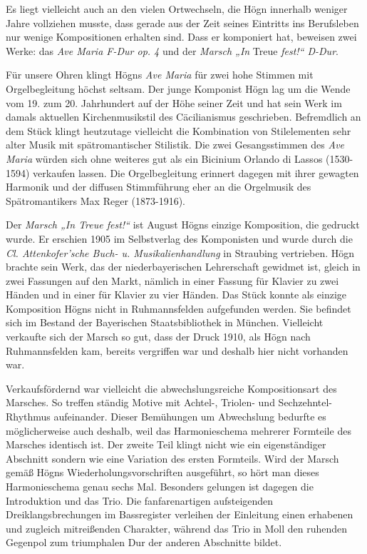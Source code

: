 \documentclass{book}
\begin{document}
Es liegt vielleicht auch an den vielen Ortwechseln, die Högn innerhalb
we\-niger Jahre vollziehen musste, dass gerade aus der Zeit seines
Eintritts ins Berufsleben nur wenige Kompositionen erhalten sind. Dass
er komponiert hat, beweisen zwei Werke: das \textit{Ave Maria F-Dur op.
4} und der \textit{Marsch „In} Treue \textit{fest!“ D-Dur}.

Für unsere Ohren klingt Högns \textit{Ave Maria} für zwei hohe Stimmen
mit Or\-gelbegleitung höchst seltsam. Der junge Komponist Högn lag um
die Wende vom 19. zum 20. Jahrhundert auf der Höhe seiner Zeit und hat
sein Werk im damals aktuellen Kirchenmusikstil des Cäcilianismus
geschrieben. Befremdlich an dem Stück klingt heutzutage vielleicht die
Kombination von Stilelementen sehr alter Musik mit spätromantischer
Stilistik. Die zwei Gesangsstimmen des \textit{Ave Maria} würden sich
ohne weiteres gut als ein Bicinium Orlando di Lassos (1530-1594)
verkaufen lassen. Die Orgelbegleitung erinnert dagegen mit ihrer
gewagten Harmonik und der diffusen Stimmführung eher an die Orgelmusik
des Spätromantikers Max Reger (1873-1916). 

Der \textit{Marsch „In Treue fest!“} ist August Högns einzige
Komposition, die ge\-druckt wurde. Er erschien 1905 im Selbstverlag des
Komponisten und wurde durch die \textit{Cl. Attenkofer’sche Buch- u.
Musikalienhandlung} in Straubing vertrieben. Högn brachte sein Werk,
das der niederbayerischen Lehrerschaft gewidmet ist, gleich in zwei
Fassungen auf den Markt, nämlich in einer Fassung für Klavier zu zwei
Händen und in einer für Klavier zu vier Händen. Das Stück konnte als
einzige Komposition Högns nicht in Ruhmannsfelden aufgefunden wer\-den.
Sie befindet sich im Bestand der Bayerischen Staatsbibliothek in
Mün\-chen. Vielleicht verkaufte sich der Marsch so gut, dass der Druck
1910, als Högn nach Ruhmannsfelden kam, bereits vergriffen war und
deshalb hier nicht vorhanden war.


Verkaufsfördernd war vielleicht die abwechslungsreiche Kompositionsart
des Marsches. So treffen ständig Motive mit Achtel-, Triolen- und
Sechzehntel-Rhythmus aufeinander. Dieser Bemühungen um Abwechslung
bedurfte es möglicherweise auch deshalb, weil das Harmonieschema
mehrerer Formteile des Marsches identisch ist. Der zweite Teil klingt
nicht wie ein eigenständiger Abschnitt sondern wie eine Variation des
ersten Formteils. Wird der Marsch gemäß Högns Wiederholungsvorschriften
ausgeführt, so hört man dieses Har\-monieschema genau sechs Mal.
Besonders gelungen ist dagegen die Introduk\-tion und das Trio. Die
fanfarenartigen aufsteigenden Dreiklangsbrechungen im Bassregister
verleihen der Einleitung einen erhabenen und zugleich mit\-reißenden
Charakter, während das Trio in Moll den ruhenden Gegenpol zum
triumphalen Dur der anderen Abschnitte bildet.
\end{document}
